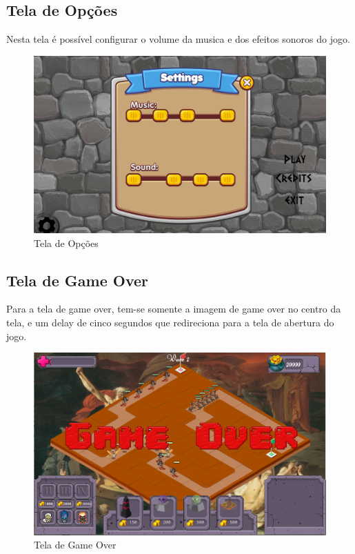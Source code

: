 \documentclass[11pt]{article} %
\begin{document}
\newpage

\subsection{Tela de Opções}
Nesta tela é possível configurar o volume da musica e dos efeitos sonoros do jogo.

\begin{figure}[!htp]
\centering
\includegraphics[scale=0.3]{res/musica.png}
\caption{Tela de Opções}
\end{figure}

\newpage
\subsection{Tela de Game Over}

Para a tela de game over, tem-se somente a imagem de game over no centro da tela, e um delay de cinco segundos que redireciona para a tela de abertura do jogo. 
\begin{figure}[!htp]
\centering
\includegraphics[scale=0.3]{res/game_over.png}
\caption{Tela de Game Over}
\label{Game Over}
\end{figure}
\newpage
\newpage
\end{document}
